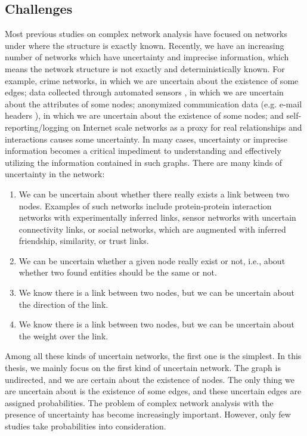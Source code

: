 \documentclass[\main/thesis.tex]{subfiles}
\begin{document}
\subsection{Challenges} \label{challenges}
Most previous studies on complex network analysis have focused on networks under where the structure is exactly known. Recently, we have an increasing number of networks which have uncertainty and imprecise information, which means the network structure is not exactly and deterministically known. For example, crime networks, in which we are uncertain about the existence of some edges; data collected through automated sensors \cite{choudhury2006towards}, in which we are uncertain about the attributes of some nodes; anonymized communication data (e.g. e-mail headers \cite{adamic2005search}), in which we are uncertain about the existence of some nodes; and self-reporting/logging on Internet scale networks \cite{boyd2004friendster} as a proxy for real relationships and interactions causes some uncertainty. In many cases, uncertainty or imprecise information becomes a critical impediment to understanding and effectively utilizing the information contained in such graphs. There are many kinds of uncertainty in the network:

\begin{enumerate}
\item We can be uncertain about whether there really exists a link between two nodes. Examples of such networks  include  protein-protein  interaction  networks  with experimentally inferred links, sensor networks with  uncertain  connectivity  links,  or  social  networks, which are augmented with inferred friendship, similarity, or trust links. 
\item We can be uncertain whether a given node really exist or not, i.e., about whether two found entities should be the same or not.
\item We know there is a link between two nodes, but we can be uncertain about the direction of the link.
\item We know there is a link between two nodes, but we can be uncertain about the weight over the link.
\end{enumerate}

Among all these kinds of uncertain networks, the first one is the simplest. In this thesis, we mainly focus on the first kind of uncertain network. The graph is undirected, and we are certain about the existence of nodes. The only thing we are uncertain about is the existence of some edges, and these uncertain edges are assigned probabilities. The problem of complex network analysis with the presence of uncertainty has become increasingly important. However, only few studies take probabilities into consideration.
\end{document}
